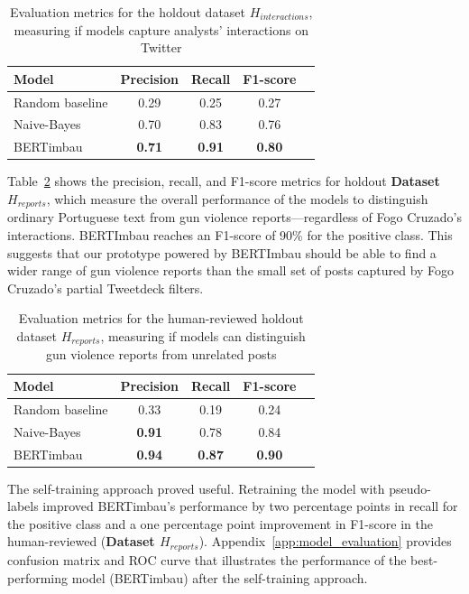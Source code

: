 \documentclass[11pt,letterpaper]{article}
\begin{document}
\begin{table}[h]
\centering
\caption{Evaluation metrics for the holdout dataset $ H_{interactions}$, measuring if models capture analysts' interactions on Twitter}
\label{tab:scores-raw}
\begin{tabular}{lcccc}
\toprule
\textbf{Model} & \textbf{Precision} & \textbf{Recall} & \textbf{F1-score} \\
\midrule
Random baseline & 0.29 & 0.25 & 0.27 \\
Naive-Bayes & 0.70 & 0.83 & 0.76 \\
BERTimbau & \textbf{0.71} & \textbf{0.91} & \textbf{0.80} \\
\bottomrule
\end{tabular}
\end{table}

Table~\ref{tab:scores-label} shows  the precision, recall, and F1-score metrics for holdout \textbf{Dataset $ H_{reports}$}, which measure the overall performance of the models to distinguish ordinary Portuguese text from gun violence reports---regardless of Fogo Cruzado's interactions. BERTImbau reaches an F1-score of 90\% for the positive class. This suggests that our prototype powered by BERTImbau should be able to find a wider range of gun violence reports than the small set of posts captured by Fogo Cruzado's partial Tweetdeck filters. 

\begin{table}[h]
\centering
\caption{Evaluation metrics for the human-reviewed holdout dataset $ H_{reports}$, measuring if models can distinguish gun violence reports from unrelated posts}
\label{tab:scores-label}
\begin{tabular}{lcccc}
\toprule
\textbf{Model} & \textbf{Precision} & \textbf{Recall} & \textbf{F1-score} \\
\midrule
Random baseline & 0.33 & 0.19 & 0.24 \\
Naive-Bayes & \textbf{0.91} & 0.78 & 0.84 \\
BERTimbau  & \textbf{0.94} & \textbf{0.87} & \textbf{0.90} \\
\bottomrule
\end{tabular}
\end{table}

The self-training approach proved useful. Retraining the model with pseudo-labels improved BERTimbau's performance by two percentage points in recall for the positive class and a one percentage point improvement in F1-score in the human-reviewed (\textbf{Dataset $ H_{reports}$}). Appendix~\ref{app:model_evaluation} provides confusion matrix and ROC curve that illustrates the performance of the best-performing model (BERTimbau) after the self-training approach.
\end{document}
